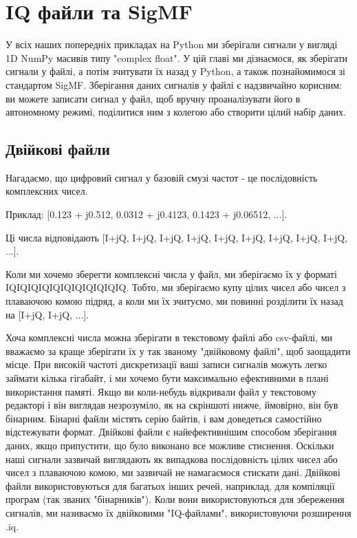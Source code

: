 \chapter{IQ файли та SigMF}\label{iq-files-chapter}

У всіх наших попередніх прикладах на Python ми зберігали сигнали у
вигляді 1D NumPy масивів типу "complex float". У цій главі ми
дізнаємося, як зберігати сигнали у файлі, а потім зчитувати їх назад у
Python, а також познайомимося зі стандартом SigMF. Зберігання даних
сигналів у файлі є надзвичайно корисним: ви можете записати сигнал у
файл, щоб вручну проаналізувати його в автономному режимі, поділитися
ним з колегою або створити цілий набір даних.

\section{Двійкові
файли}\label{ux434ux432ux456ux439ux43aux43eux432ux456-ux444ux430ux439ux43bux438}

Нагадаємо, що цифровий сигнал у базовій смузі частот - це послідовність
комплексних чисел.

Приклад: {[}0.123 + j0.512, 0.0312 + j0.4123, 0.1423 + j0.06512, ...{]}.

Ці числа відповідають {[}I+jQ, I+jQ, I+jQ, I+jQ, I+jQ, I+jQ, I+jQ, I+jQ,
I+jQ, ...{]}.

Коли ми хочемо зберегти комплексні числа у файл, ми зберігаємо їх у
форматі IQIQIQIQIQIQIQIQIQIQIQ. Тобто, ми зберігаємо купу цілих чисел
або чисел з плаваючою комою підряд, а коли ми їх зчитуємо, ми повинні
розділити їх назад на {[}I+jQ, I+jQ, ...{]}.

Хоча комплексні числа можна зберігати в текстовому файлі або csv-файлі,
ми вважаємо за краще зберігати їх у так званому "двійковому файлі", щоб
заощадити місце. При високій частоті дискретизації ваші записи сигналів
можуть легко займати кілька гігабайт, і ми хочемо бути максимально
ефективними в плані використання пам\textquotesingle яті. Якщо ви
коли-небудь відкривали файл у текстовому редакторі і він виглядав
незрозуміло, як на скріншоті нижче, ймовірно, він був бінарним. Бінарні
файли містять серію байтів, і вам доведеться самостійно відстежувати
формат. Двійкові файли є найефективнішим способом зберігання даних, якщо
припустити, що було виконано все можливе стиснення. Оскільки наші
сигнали зазвичай виглядають як випадкова послідовність цілих чисел або
чисел з плаваючою комою, ми зазвичай не намагаємося стискати дані.
Двійкові файли використовуються для багатьох інших речей, наприклад, для
компіляції програм (так званих "бінарників"). Коли вони використовуються
для збереження сигналів, ми називаємо їх двійковими "IQ-файлами",
використовуючи розширення .iq.

